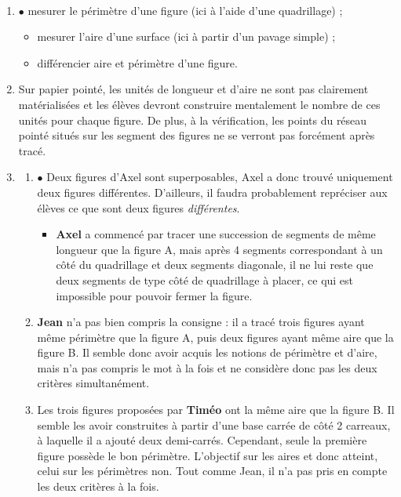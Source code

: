 {\begin{corrige}
\ \\ [-5mm]
\begin{enumerate}
   \item \textcolor{A1}{$\bullet$} mesurer le périmètre d'une figure (ici à l'aide d'une quadrillage) ;
   \begin{itemize}
      \item mesurer l'aire d'une surface (ici à partir d'un pavage simple) ;
      \item différencier aire et périmètre d'une figure.
   \end{itemize}
\end{enumerate}
\Coupe
\begin{enumerate}
\setcounter{enumi}{1}
   \item Sur papier pointé, les unités de longueur et d'aire ne sont pas clairement matérialisées et les élèves devront construire mentalement le nombre de ces unités pour chaque figure. De plus, à la vérification, les \og points \fg{} du réseau pointé situés sur les segment des figures ne se verront pas forcément après tracé.
   \item 
   \begin{enumerate}
      \item \textcolor{A1}{$\bullet$} Deux figures d'Axel sont superposables, Axel a donc trouvé uniquement deux figures différentes. D'ailleurs, il faudra probablement repréciser aux élèves ce que sont deux figures {\it différentes}.
      \begin{itemize}
         \item {\bf Axel} a commencé par tracer une succession de segments de même longueur que la figure A, mais après 4 segments correspondant à un côté du quadrillage et deux segments diagonale, il ne lui reste que deux segments de type côté de quadrillage à placer, ce qui est impossible pour pouvoir fermer la figure.
      \end{itemize}
      \item {\bf Jean} n'a pas bien compris la consigne : il a tracé trois figures ayant même périmètre que la figure A, puis deux figures ayant même aire que la figure B. Il semble donc avoir acquis les notions de périmètre et d'aire, mais n'a pas compris le mot \og à la fois \fg{} et ne considère donc pas les deux critères simultanément.
      \item Les trois figures proposées par {\bf Timéo} ont la même aire que la figure B. Il semble les avoir construites à partir d'une base carrée de côté 2 carreaux, à laquelle il a ajouté deux demi-carrés. Cependant, seule la première figure possède le bon périmètre. L'objectif sur les aires et donc atteint, celui sur les périmètres non. Tout comme Jean, il n'a pas pris en compte les deux critères à la fois.

\end{enumerate}
\end{enumerate}
\end{corrige}}
